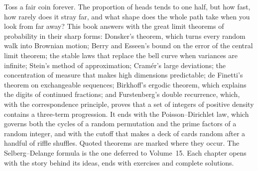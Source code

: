 Toss a fair coin forever. The proportion of heads tends to one half, but how fast, how rarely does it stray far, and what
shape does the whole path take when you look from far away? This book answers with the great limit theorems of probability
in their sharp forms: Donsker's theorem, which turns every random walk into Brownian motion; Berry and Esseen's bound on the
error of the central limit theorem; the stable laws that replace the bell curve when variances are infinite; Stein's method
of approximation; Cram\'er's large deviations; the concentration of measure that makes high dimensions predictable; de
Finetti's theorem on exchangeable sequences; Birkhoff's ergodic theorem, which explains the digits of continued fractions;
and Furstenberg's double recurrence, which, with the correspondence principle, proves that a set of integers of positive density contains a three-term progression. It ends with the Poisson--Dirichlet law, which governs both the
cycles of a random permutation and the prime factors of a random integer, and with the cutoff that makes a deck of cards random after a handful of riffle shuffles. Quoted theorems are marked where they occur. The Selberg--Delange formula is the one deferred to Volume~15. Each chapter
opens with the story behind its ideas, ends with exercises and complete solutions.
